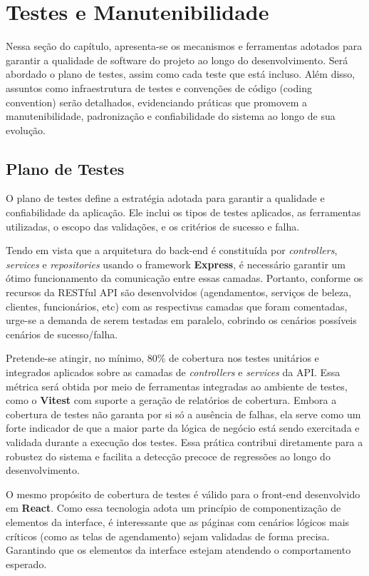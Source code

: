 \section{Testes e Manutenibilidade}
Nessa seção do capítulo, apresenta-se os mecanismos e ferramentas adotados para garantir a qualidade de software do projeto ao longo do desenvolvimento.
Será abordado o plano de testes, assim como cada teste que está incluso. Além disso, assuntos como infraestrutura de testes e convenções de código (coding convention)
serão detalhados, evidenciando práticas que promovem a manutenibilidade, padronização e confiabilidade do sistema ao longo de sua evolução.

\subsection{Plano de Testes}
O plano de testes define a estratégia adotada para garantir a qualidade e confiabilidade da aplicação. 
Ele inclui os tipos de testes aplicados, as ferramentas utilizadas, o escopo das validações, e os critérios de sucesso e falha.

Tendo em vista que a arquitetura do back-end é constituída por \textit{controllers}, \textit{services} e \textit{repositories} usando o framework \textbf{Express}, 
é necessário garantir um ótimo funcionamento da comunicação entre essas camadas. Portanto, conforme os recursos da RESTful API
são desenvolvidos (agendamentos, serviços de beleza, clientes, funcionários, etc) com as respectivas camadas que foram comentadas,
urge-se a demanda de serem testadas em paralelo, cobrindo os cenários possíveis cenários de sucesso/falha. 

Pretende-se atingir, no mínimo, 80\% de cobertura nos testes unitários e integrados aplicados 
sobre as camadas de \textit{controllers} e \textit{services} da API. 
Essa métrica será obtida por meio de ferramentas integradas ao ambiente de testes, como o \textbf{Vitest} com suporte a geração de relatórios de cobertura. Embora a cobertura de testes não garanta por si só a ausência de falhas, ela serve como um forte indicador de que a maior parte da lógica de negócio está sendo exercitada e validada durante a execução dos testes. Essa prática contribui diretamente para a robustez do sistema 
e facilita a detecção precoce de regressões ao longo do desenvolvimento.

O mesmo propósito de cobertura de testes é válido para o front-end desenvolvido em \textbf{React}. Como essa tecnologia adota um princípio de componentização de elementos da interface,
é interessante que as páginas com cenários lógicos mais críticos (como as telas de agendamento) sejam validadas de forma precisa.
Garantindo que os elementos da interface estejam atendendo o comportamento esperado.

